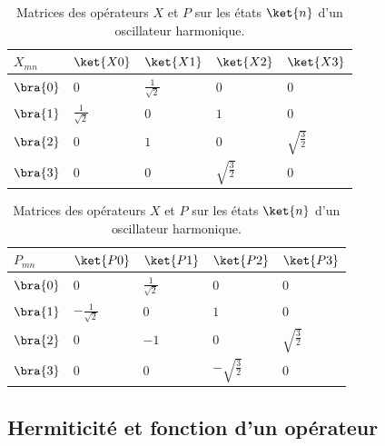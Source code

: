 \begin{example}
\begin{table}[htbp] \centering
\begin{tabular}
[c]{l|llll}\cline{1-1}%
\multicolumn{1}{|l|}{$X_{mn}$} & \cellcolor[gray]{.8}$\ket{X0}$ &
\cellcolor[gray]{.8}$\ket{X1}$ &
\cellcolor[gray]{.8}$\ket{X2}$ &
\cellcolor[gray]{.8}$\ket{X3}$\\\hline
\cellcolor[gray]{.8}$\bra{0}$ & $0$ &
\multicolumn{1}{|l}{$\frac{1}{\sqrt{2}}$} & \multicolumn{1}{|l}{$0$} &
\multicolumn{1}{|l|}{$0$}\\\cline{2-5}%
\cellcolor[gray]{.8}$\bra{1}$ & $\frac{1}{\sqrt{2}}$ &
\multicolumn{1}{|l}{$0$} & \multicolumn{1}{|l}{$1$} & \multicolumn{1}{|l|}{$0$%
}\\\cline{2-5}%
\cellcolor[gray]{.8}$\bra{2}$ & $0$ &
\multicolumn{1}{|l}{$1$} & \multicolumn{1}{|l}{$0$} &
\multicolumn{1}{|l|}{$\sqrt{\frac{3}{2}}$}\\\cline{2-5}%
\cellcolor[gray]{.8}$\bra{3}$ & $0$ &
\multicolumn{1}{|l}{$0$} & \multicolumn{1}{|l}{$\sqrt{\frac{3}{2}}$} &
\multicolumn{1}{|l|}{$0$}\\\cline{2-5}%
\end{tabular}
\begin{tabular}
[c]{l|llll}\cline{1-1}%
\multicolumn{1}{|l|}{$P_{mn}$} & \cellcolor[gray]{.8}$\ket{
P0}$ & \cellcolor[gray]{.8}$\ket{P1}$ &
\cellcolor[gray]{.8}$\ket{P2}$ &
\cellcolor[gray]{.8}$\ket{P3}$\\\hline
\cellcolor[gray]{.8}$\bra{0}$ & $0$ &
\multicolumn{1}{|l}{$\frac{1}{\sqrt{2}}$} & \multicolumn{1}{|l}{$0$} &
\multicolumn{1}{|l|}{$0$}\\\cline{2-5}%
\cellcolor[gray]{.8}$\bra{1}$ & $-\frac{1}{\sqrt{2}}$ &
\multicolumn{1}{|l}{$0$} & \multicolumn{1}{|l}{$1$} & \multicolumn{1}{|l|}{$0$%
}\\\cline{2-5}%
\cellcolor[gray]{.8}$\bra{2}$ & $0$ &
\multicolumn{1}{|l}{$-1$} & \multicolumn{1}{|l}{$0$} &
\multicolumn{1}{|l|}{$\sqrt{\frac{3}{2}}$}\\\cline{2-5}%
\cellcolor[gray]{.8}$\bra{3}$ & $0$ &
\multicolumn{1}{|l}{$0$} & \multicolumn{1}{|l}{$-\sqrt{\frac{3}{2}}$} &
\multicolumn{1}{|l|}{$0$}\\\cline{2-5}%
\end{tabular}
\caption{Matrices des opérateurs $X$ et $P$ sur les états $\ket{n}$ d'un
oscillateur harmonique.}\label{tab:matrXP}%
\end{table}%

\end{example}

\subsection{Hermiticité et fonction d'un opérateur}

